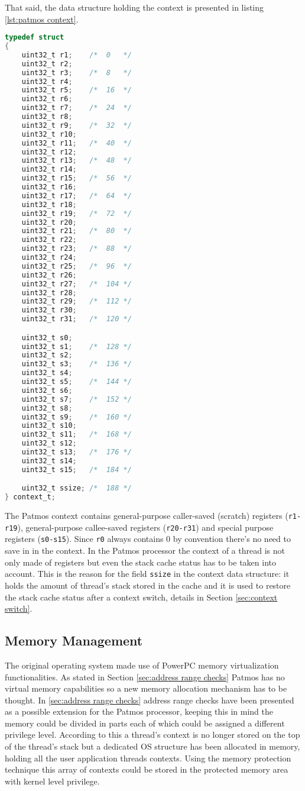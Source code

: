 That said, the data structure holding the context is presented in listing \ref{lst:patmos context}.

\begin{lstlisting}[language=C, caption=C structure holding Patmos context, label=lst:patmos context]
typedef struct
{
	uint32_t r1;	/*	0	*/
	uint32_t r2;
	uint32_t r3;	/*	8	*/
	uint32_t r4;
	uint32_t r5;	/*	16	*/
	uint32_t r6;
	uint32_t r7;	/*	24	*/
	uint32_t r8;
	uint32_t r9;	/*	32	*/
	uint32_t r10;
	uint32_t r11;	/*	40	*/
	uint32_t r12;
	uint32_t r13;	/*	48	*/
	uint32_t r14;
	uint32_t r15;	/*	56	*/
	uint32_t r16;
	uint32_t r17;	/*	64	*/
	uint32_t r18;
	uint32_t r19;	/*	72	*/
	uint32_t r20;
	uint32_t r21;	/*	80	*/	
	uint32_t r22;
	uint32_t r23;	/*	88	*/	
	uint32_t r24;
	uint32_t r25;	/*	96	*/
	uint32_t r26;
	uint32_t r27;	/*	104	*/
	uint32_t r28;
	uint32_t r29;	/*	112	*/	
	uint32_t r30;
	uint32_t r31;	/*	120	*/

	uint32_t s0;
	uint32_t s1;	/*	128	*/
	uint32_t s2;
	uint32_t s3;	/*	136	*/
	uint32_t s4;
	uint32_t s5;	/*	144	*/
	uint32_t s6;
	uint32_t s7;	/*	152	*/
	uint32_t s8;
	uint32_t s9;	/*	160	*/
	uint32_t s10;
	uint32_t s11;	/*	168	*/
	uint32_t s12;
	uint32_t s13;	/*	176	*/
	uint32_t s14;
	uint32_t s15;	/*	184	*/

	uint32_t ssize; /*	188	*/
} context_t;
\end{lstlisting}

The Patmos context contains general-purpose caller-saved (scratch) registers (\texttt{r1-r19}), general-purpose callee-saved registers (\texttt{r20-r31}) and special purpose registers (\texttt{s0-s15}). Since \texttt{r0} always contains 0 by convention there's no need to save in in the context. In the Patmos processor the context of a thread is not only made of registers but even the stack cache status has to be taken into account. This is the reason for the field \texttt{ssize} in the context data structure: it holds the amount of thread's stack stored in the cache and it is used to restore the stack cache status after a context switch, details in Section \ref{sec:context switch}.

\subsection{Memory Management}

The original operating system made use of PowerPC memory virtualization functionalities. As stated in Section \ref{sec:address range checks} Patmos has no virtual memory capabilities so a new memory allocation mechanism has to be thought. In \ref{sec:address range checks} address range checks have been presented as a possible extension for the Patmos processor, keeping this in mind the memory could be divided in parts each of which could be assigned a different privilege level. According to this a thread's context is no longer stored on the top of the thread's stack but a dedicated OS structure has been allocated in memory, holding all the user application threads contexts. Using the memory protection technique this array of contexts could be stored in the protected memory area with kernel level privilege.\\

